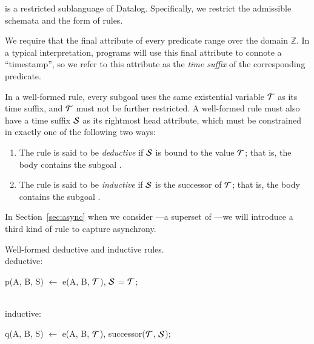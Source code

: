 \slang is a restricted sublanguage of Datalog.  Specifically, we restrict the
admissible schemata and the form of rules.

We require that the final attribute of every \slang
predicate range over the domain $\mathbb{Z}$.  In a typical
interpretation, \slang programs will use this final attribute to connote a
``timestamp'', so we refer to this attribute as the \emph{time suffix} of the
corresponding predicate.

%
%
In a well-formed \slang rule, every subgoal uses the same existential variable $\Tau$
as its time suffix, and $\Tau$ must not be further restricted.  A well-formed
\slang rule must also have a time suffix $\SDedalus$ as its rightmost head attribute, which must be
constrained in exactly one of the following two ways:
\begin{enumerate}
%
\item The rule is said to be \emph{deductive} if $\SDedalus$ is bound to the
value $\Tau$; that is, the body contains the subgoal \dedalus{$\SDedalus$ = $\Tau$}.
%
\item The rule is said to be {\em inductive} if $\SDedalus$ is the successor of
$\Tau$; that is, the body contains the subgoal .
%
\end{enumerate}

In Section~\ref{sec:async} when we consider \lang---a superset of \slang---we will
introduce a third kind of rule to capture asynchrony.

\begin{example}
Well-formed deductive and inductive rules.
\\
deductive:
\begin{Dedalus}
p(A, B, S) \(\leftarrow\) e(A, B, \(\Tau\)), \(\SDedalus\) = \(\Tau\);
\end{Dedalus}
\\
inductive:
\begin{Dedalus}
q(A, B, S) \(\leftarrow\) e(A, B, \(\Tau\)), successor(\(\Tau\), \(\SDedalus\));
\end{Dedalus}
\end{example}

